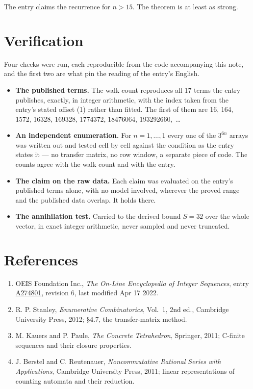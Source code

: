\documentclass[11pt]{article}
\theoremstyle{definition}
\begin{document}
The entry claims the recurrence for $n > 15$. The theorem is at least as strong.

\section{Verification}

Four checks were run, each reproducible from the code accompanying this note, and the first two are what pin the reading of the entry's English.

\begin{itemize}

\item {\bfseries The published terms.} The walk count reproduces all 17 terms the entry publishes, exactly, in integer arithmetic, with the index taken from the entry's stated offset (1) rather than fitted. The first of them are 16, 164, 1572, 16328, 169328, 1774372, 18476064, 193292660,~\dots

\item {\bfseries An independent enumeration.} For $n = 1,\dots,1$ every one of the $3^{6n}$ arrays was written out and tested cell by cell against the condition as the entry states it --- no transfer matrix, no row window, a separate piece of code. The counts agree with the walk count and with the entry.

\item {\bfseries The claim on the raw data.} Each claim was evaluated on the entry's published terms alone, with no model involved, wherever the proved range and the published data overlap. It holds there.

\item {\bfseries The annihilation test.} Carried to the derived bound $S = 32$ over the whole vector, in exact integer arithmetic, never sampled and never truncated.

\end{itemize}

\section{References}

\begin{enumerate}

\item OEIS Foundation Inc., \emph{The On-Line Encyclopedia of Integer Sequences}, entry \href{https://oeis.org/A274801}{A274801}, revision 6, last modified Apr 17 2022.

\item R. P. Stanley, \emph{Enumerative Combinatorics}, Vol.~1, 2nd ed., Cambridge University Press, 2012; \S4.7, the transfer-matrix method.

\item M. Kauers and P. Paule, \emph{The Concrete Tetrahedron}, Springer, 2011; C-finite sequences and their closure properties.

\item J. Berstel and C. Reutenauer, \emph{Noncommutative Rational Series with Applications}, Cambridge University Press, 2011; linear representations of counting automata and their reduction.

\end{enumerate}
\end{document}
